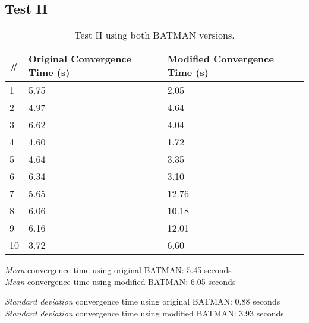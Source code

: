 \subsection{Test II}
\begin{table}[h]
	\centering
	\begin{tabular}{| l || p{35mm} | p{35mm} |}\hline
	\textbf{\#} & \textbf{Original Convergence Time (s)} & \textbf{Modified Convergence Time (s)}\\\hline
		 1 & 5.75 & 2.05\\\hline
		 2 & 4.97 & 4.64\\\hline
		 3 & 6.62 & 4.04\\\hline
		 4 & 4.60 & 1.72\\\hline
		 5 & 4.64 & 3.35\\\hline
		 6 & 6.34 & 3.10\\\hline
		 7 & 5.65 & 12.76\\\hline
		 8 & 6.06 & 10.18\\\hline
		 9 & 6.16 & 12.01\\\hline
		10 & 3.72 & 6.60\\\hline
	\end{tabular}
	\caption{Test II using both BATMAN versions.}
	\label{tab:test2}
\end{table}

\emph{Mean} convergence time using original BATMAN: 5.45 seconds\\
\emph{Mean} convergence time using modified BATMAN: 6.05 seconds

\emph{Standard deviation} convergence time using original BATMAN: 0.88 seconds\\
\emph{Standard deviation} convergence time using modified BATMAN: 3.93 seconds